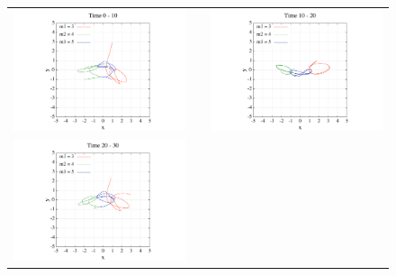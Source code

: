 \documentclass[11pt,a4paper,oneside,onecolumn]{jreport}
\begin{document}
\begin{figure}[H]
\begin{tabular}{ccc}
\begin{minipage}[t]{0.45\hsize}
\centering
\includegraphics[width=8cm]{./image/pythagoras_orbit_0to10.pdf}
\end{minipage} &
\begin{minipage}[t]{0.1\hsize}
\end{minipage} &
\begin{minipage}[t]{0.45\hsize}
\centering
\includegraphics[width=8cm]{./image/pythagoras_orbit_10to20.pdf}
\end{minipage}\\
%
\begin{minipage}[t]{0.45\hsize}
\centering
\includegraphics[width=8cm]{./image/pythagoras_orbit_20to30.pdf}
\end{minipage} &

\end{tabular}
\end{figure}
\end{document}
